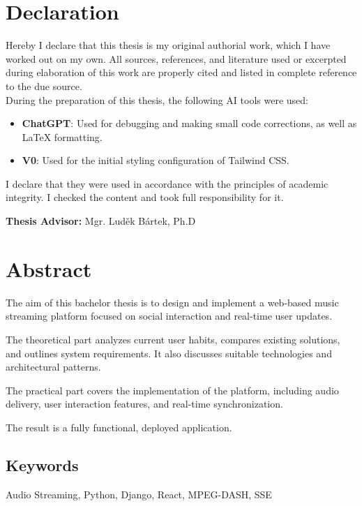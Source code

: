 \section*{Declaration}
Hereby I declare that this thesis is my original authorial work, which I have worked out on my own. All
sources, references, and literature used or excerpted during elaboration of this work are properly cited and
listed in complete reference to the due source.
\\
During the preparation of this thesis, the following AI tools were used:

\begin{itemize}
    \item \textbf{ChatGPT}: Used for debugging and making small code corrections, as well as LaTeX formatting.
    \item \textbf{V0}: Used for the initial styling configuration of Tailwind CSS.
\end{itemize}

I declare that they were used in accordance with the principles of academic integrity.
I checked the content and took full responsibility for it.

\vfill\noindent
\textbf{Thesis Advisor:} Mgr. Luděk Bártek, Ph.D
\cleardoublepage

\section*{Abstract}

The aim of this bachelor thesis is to design and implement
a web-based music streaming platform focused on social interaction and
real-time user updates.

The theoretical part analyzes current user habits,
compares existing solutions, and outlines system requirements.
It also discusses suitable technologies and architectural patterns.

The practical part covers the implementation of the platform,
including audio delivery,
user interaction features, and real-time synchronization.

The result is a fully functional, deployed application.

\subsection*{Keywords}
Audio Streaming, Python, Django, React, MPEG-DASH, SSE
